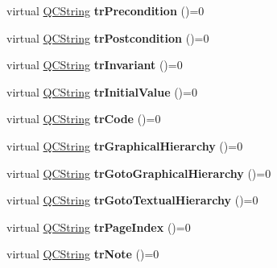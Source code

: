 \begin{DoxyCompactItemize}
\mbox{\label{class_translator_a1908a5ec684a3fb38fdfc50346d18530}} 
virtual \mbox{\hyperlink{class_q_c_string}{Q\+C\+String}} {\bfseries tr\+Precondition} ()=0
\item 
\mbox{\label{class_translator_a970c167e640eff619d4202266c4cb0ce}} 
virtual \mbox{\hyperlink{class_q_c_string}{Q\+C\+String}} {\bfseries tr\+Postcondition} ()=0
\item 
\mbox{\label{class_translator_af9a644c79e6da8b784bb0fe03a37fb15}} 
virtual \mbox{\hyperlink{class_q_c_string}{Q\+C\+String}} {\bfseries tr\+Invariant} ()=0
\item 
\mbox{\label{class_translator_a79f4a5405cc412a027d7d35dd9b3d2d9}} 
virtual \mbox{\hyperlink{class_q_c_string}{Q\+C\+String}} {\bfseries tr\+Initial\+Value} ()=0
\item 
\mbox{\label{class_translator_af85261d5c63262a8dfdf918fd1b35fc2}} 
virtual \mbox{\hyperlink{class_q_c_string}{Q\+C\+String}} {\bfseries tr\+Code} ()=0
\item 
\mbox{\label{class_translator_a365fa800907a883b1659566f420ee4ee}} 
virtual \mbox{\hyperlink{class_q_c_string}{Q\+C\+String}} {\bfseries tr\+Graphical\+Hierarchy} ()=0
\item 
\mbox{\label{class_translator_a28654b6dd890c89f1df2a6ff11f65976}} 
virtual \mbox{\hyperlink{class_q_c_string}{Q\+C\+String}} {\bfseries tr\+Goto\+Graphical\+Hierarchy} ()=0
\item 
\mbox{\label{class_translator_ab8e328e4648c861e894f7c7348e2a9cf}} 
virtual \mbox{\hyperlink{class_q_c_string}{Q\+C\+String}} {\bfseries tr\+Goto\+Textual\+Hierarchy} ()=0
\item 
\mbox{\label{class_translator_a5e4d73ddc4d881e32b687dfcc29a8118}} 
virtual \mbox{\hyperlink{class_q_c_string}{Q\+C\+String}} {\bfseries tr\+Page\+Index} ()=0
\item 
\mbox{\label{class_translator_a9172f5a9cd750add7d839c184e349cd2}} 
virtual \mbox{\hyperlink{class_q_c_string}{Q\+C\+String}} {\bfseries tr\+Note} ()=0

\end{DoxyCompactItemize}
